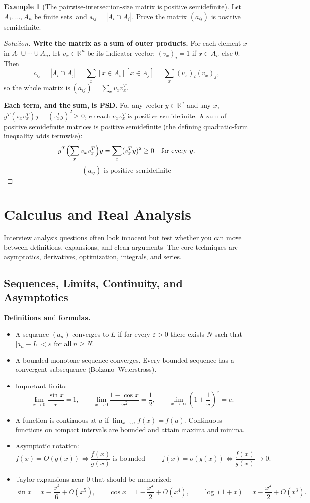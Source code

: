 \documentclass[11pt]{article}
\theoremstyle{definition}
\newtheorem{example}{Example}[section]
\newcommand{\R}{\mathbb{R}}
\begin{document}
\begin{example}[The pairwise-intersection-size matrix is positive semidefinite]
Let $A_1,\dots,A_n$ be finite sets, and $a_{ij}=|A_i\cap A_j|$. Prove the matrix $(a_{ij})$ is positive semidefinite.
\end{example}
\begin{proof}[Solution]
\textbf{Write the matrix as a sum of outer products.} For each element $x$ in $A_1\cup\cdots\cup A_n$, let $v_x\in\R^n$ be its indicator vector: $(v_x)_i=1$ if $x\in A_i$, else $0$. Then
\[
a_{ij}=|A_i\cap A_j|=\sum_x[x\in A_i][x\in A_j]=\sum_x(v_x)_i(v_x)_j,
\]
so the whole matrix is $\displaystyle(a_{ij})=\sum_xv_xv_x^T$.

\textbf{Each term, and the sum, is PSD.} For any vector $y\in\R^n$ and any $x$, $y^T(v_xv_x^T)y=(v_x^Ty)^2\ge0$, so each $v_xv_x^T$ is positive semidefinite. A sum of positive semidefinite matrices is positive semidefinite (the defining quadratic-form inequality adds termwise):
\[
y^T\Bigl(\sum_xv_xv_x^T\Bigr)y=\sum_x(v_x^Ty)^2\ge0\quad\text{for every }y.
\]
\[
\boxed{(a_{ij})\text{ is positive semidefinite}}
\]
\end{proof}

\section{Calculus and Real Analysis}
Interview analysis questions often look innocent but test whether you can move between definitions, expansions, and clean arguments. The core techniques are asymptotics, derivatives, optimization, integrals, and series.

\subsection{Sequences, Limits, Continuity, and Asymptotics}
\textbf{Definitions and formulas.}
\begin{itemize}
    \item A sequence $(a_n)$ converges to $L$ if for every $\varepsilon>0$ there exists $N$ such that $|a_n-L|<\varepsilon$ for all $n\ge N$.
    \item A bounded monotone sequence converges. Every bounded sequence has a convergent subsequence (Bolzano--Weierstrass).
    \item Important limits:
    \[
        \lim_{x\to 0}\frac{\sin x}{x}=1,
        \qquad
        \lim_{x\to 0}\frac{1-\cos x}{x^2}=\frac12,
        \qquad
        \lim_{x\to \infty}\left(1+\frac1x\right)^x=e.
    \]
    \item A function is continuous at $a$ if $\lim_{x\to a}f(x)=f(a)$. Continuous functions on compact intervals are bounded and attain maxima and minima.
    \item Asymptotic notation:
    \[
        f(x)=O(g(x)) \iff \frac{f(x)}{g(x)} \text{ is bounded},
        \qquad
        f(x)=o(g(x)) \iff \frac{f(x)}{g(x)}\to 0.
    \]
    \item Taylor expansions near $0$ that should be memorized:
    \[
        \sin x = x - \frac{x^3}{6}+O(x^5),
        \qquad
        \cos x = 1 - \frac{x^2}{2}+O(x^4),
        \qquad
        \log(1+x)=x-\frac{x^2}{2}+O(x^3).
    \]
\end{itemize}
\end{document}
